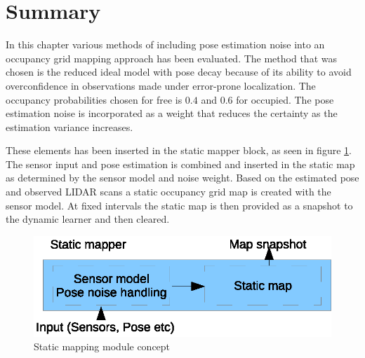 \section{Summary}
In this chapter various methods of including pose estimation noise into an occupancy grid mapping approach has been evaluated. 
The method that was chosen is the reduced ideal model with pose decay because of its ability to avoid overconfidence in observations made under error-prone localization. 
The occupancy probabilities chosen for free is \(0.4\) and \(0.6\) for occupied. The pose estimation noise is incorporated as a weight that reduces the certainty as the estimation variance increases.  

These elements has been inserted in the static mapper block, as seen in figure \ref{fig:static_map_detail}. 
The sensor input and pose estimation is combined and inserted in the static map as determined by the sensor model and noise weight.
Based on the estimated pose and observed LIDAR scans a static occupancy grid map is created with the sensor model. 
At fixed intervals the static map is then provided as a snapshot to the dynamic learner and then cleared. 

\begin{figure}[htbp]
	\centering
	\includegraphics[scale=1]{chapters/static_mapping/figures/static_map_detail.eps}
	\caption{Static mapping module concept}
	\label{fig:static_map_detail}
\end{figure}

